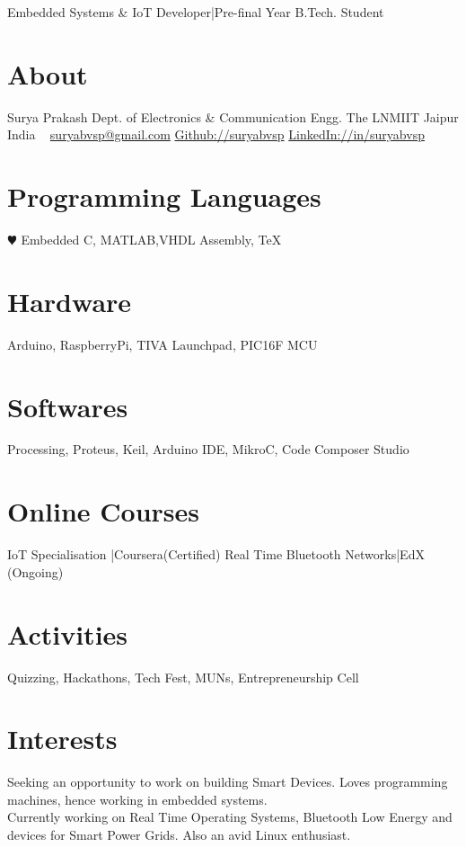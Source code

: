 \documentclass[]{friggeri-cv}
\begin{document}
       {Embedded Systems \& IoT Developer|Pre-final Year B.Tech. Student}

\begin{aside}
  \section{About}
    Surya Prakash
    Dept. of Electronics \& Communication Engg.
    The LNMIIT
    Jaipur
    India
    ~
    \href{mailto:suryabvsp@gmail.com}{suryabvsp@gmail.com}
    \href{https://github.com/suryabvsp/}{Github://suryabvsp}
    \href{https://www.linkedin.com/in/suryabvsp/}{LinkedIn://in/suryabvsp}
    ~
  \section{Programming Languages}
    {\color{red} $\varheartsuit$} Embedded C,
    MATLAB,VHDL
    Assembly, \TeX
  \section{Hardware}
    Arduino, RaspberryPi,
    TIVA Launchpad,
    PIC16F MCU
  \section{Softwares}
    Processing, Proteus,
    Keil, Arduino IDE,
    MikroC, Code Composer Studio
  \section{Online Courses}
    IoT Specialisation
    |Coursera(Certified)
    Real Time Bluetooth Networks|EdX
    (Ongoing) 
    ~
    ~
    ~
    ~
    ~
    ~
    \section{Activities}
    Quizzing, Hackathons,
    Tech Fest, MUNs,
    Entrepreneurship Cell
\end{aside}

\section{Interests}

Seeking an opportunity to work on building Smart Devices. Loves programming machines, hence working in embedded systems.\\ Currently working on Real Time Operating Systems, Bluetooth Low Energy and devices for Smart Power Grids. Also an avid Linux enthusiast.
\end{document}
